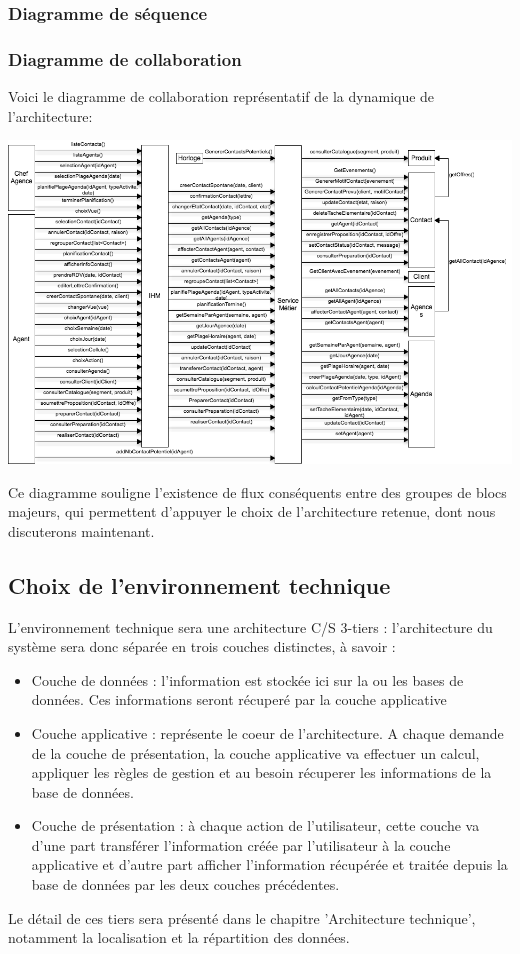 \subsubsection{Diagramme de séquence}

\subsubsection{Diagramme de collaboration}

Voici le diagramme de collaboration représentatif de la dynamique de
l'architecture:

\begin {center}
\includegraphics[width=\textwidth]{diagramme-collaboration.png}
\end {center}

Ce diagramme souligne l'existence de flux conséquents entre des groupes de blocs
majeurs, qui permettent d'appuyer le choix de l'architecture retenue, dont nous
discuterons maintenant.


\subsection{Choix de l'environnement technique}
L'environnement technique sera une architecture C/S 3-tiers : l'architecture du système sera donc séparée en trois couches distinctes, à savoir :
\begin{itemize}
\item Couche de données : l'information est stockée ici sur la ou les bases de données. Ces informations seront récuperé par la couche applicative
\item Couche applicative : représente le coeur de l'architecture. A chaque demande de la couche de présentation, la couche applicative va effectuer un calcul, appliquer les règles de gestion et au besoin récuperer les informations de la base de données.
\item Couche de présentation : à chaque action de l'utilisateur, cette couche va d'une part transférer l'information créée par l'utilisateur à la couche applicative et d'autre part afficher l'information récupérée et traitée depuis la base de données par les deux couches précédentes.
\end{itemize}
Le détail de ces tiers sera présenté dans le chapitre 'Architecture technique', notamment la localisation et la répartition des données.

